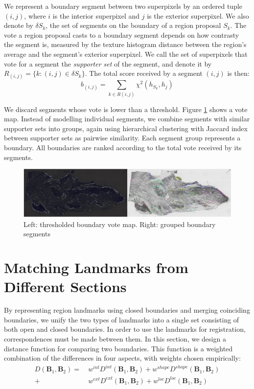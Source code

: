 \documentclass{llncs}
\begin{document}
We represent a boundary segment between two superpixels by an ordered tuple $(i,j)$, where $i$ is the interior superpixel and $j$ is the exterior superpixel. We also denote by $\delta S_k$, the set of segments on the boundary of a region proposal $S_k$. 
The vote a region proposal casts to a boundary segment depends on how contrasty the segment is, measured by the texture histogram distance between the region's average and the segment's exterior superpixel. We call the set of superpixels that vote for a segment the \textit{supporter set} of the segment, and denote it by $R_{(i,j)} = \{k: (i,j) \in \delta S_k\}$. The total score received by a segment $(i,j)$ is then: 
$$ b_{(i,j)} = \sum_{k \in R(i,j)} \chi^2(h_{S_k}, h_j)$$

We discard segments whose vote is lower than a threshold. Figure \ref{fig:BoundaryMap} shows a vote map. Instead of modelling individual segments, we combine segments with similar supporter sets into groups, again using hierarchical clustering with Jaccard index between supporter sets as pairwise similarity. Each segment group represents a boundary. All boundaries are ranked according to the total vote received by its segments. 

\begin{figure}
	\includegraphics[width=\textwidth]{../figures/BoundariesThreshAndGroupedHorizontal.png}
	\caption{Left: thresholded boundary vote map. Right: grouped boundary segments}
	\label{fig:BoundaryMap}
\end{figure}


\section{Matching Landmarks from Different Sections}

By representing region landmarks using closed boundaries and merging coinciding boundaries, we unify the two types of landmarks into a single set consisting of both open and closed boundaries. In order to use the landmarks for registration, correspondences must be made between them. In this section, we design a distance function for comparing two boundaries. This function is a weighted combination of the differences in four aspects, with weights chosen empirically:
\begin{align*}
D(\mathbf{B}_1, \mathbf{B}_2) = & ~w^{int} D^{int}(\mathbf{B}_1, \mathbf{B}_2) + w^{shape} D^{shape}(\mathbf{B}_1, \mathbf{B}_2)  \\
+ & ~w^{ext} D^{ext}(\mathbf{B}_1, \mathbf{B}_2) 
+ w^{loc} D^{loc}(\mathbf{B}_1, \mathbf{B}_2) 
\end{align*}
\end{document}
